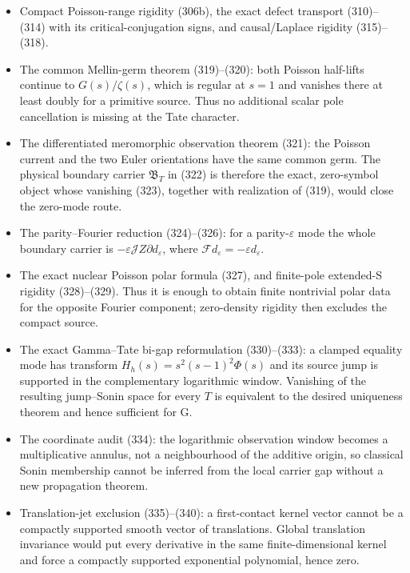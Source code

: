 \documentclass[11pt]{article}
\begin{document}
\begin{itemize}
\item Compact Poisson-range rigidity (306b), the exact defect transport
      (310)--(314) with its critical-conjugation signs, and causal/Laplace
      rigidity (315)--(318).
\item The common Mellin-germ theorem (319)--(320): both Poisson half-lifts
      continue to $G(s)/\zeta(s)$, which is regular at $s=1$ and vanishes
      there at least doubly for a primitive source.  Thus no additional
      scalar pole cancellation is missing at the Tate character.
\item The differentiated meromorphic observation theorem (321): the
      Poisson current and the two Euler orientations have the same common
      germ.  The physical boundary carrier $\mathfrak B_T$ in (322) is
      therefore the exact, zero-symbol object whose vanishing (323), together
      with realization of (319), would close the zero-mode route.
\item The parity--Fourier reduction (324)--(326): for a parity-$\varepsilon$
      mode the whole boundary carrier is
      $-\varepsilon\mathscr JZ\partial d_\varepsilon$, where
      $\mathcal Fd_\varepsilon=-\varepsilon d_\varepsilon$.
\item The exact nuclear Poisson polar formula (327), and finite-pole
      extended-S rigidity (328)--(329).  Thus it is enough to obtain finite
      nontrivial polar data for the opposite Fourier component; zero-density
      rigidity then excludes the compact source.
\item The exact Gamma--Tate bi-gap reformulation (330)--(333): a clamped
      equality mode has transform
      $H_h(s)=s^2(s-1)^2\Phi(s)$ and its source jump is supported in the
      complementary logarithmic window.  Vanishing of the resulting
      jump--Sonin space for every $T$ is equivalent to the desired uniqueness
      theorem and hence sufficient for G.
\item The coordinate audit (334): the logarithmic observation window becomes
      a multiplicative annulus, not a neighbourhood of the additive origin,
      so classical Sonin membership cannot be inferred from the local carrier
      gap without a new propagation theorem.
\item Translation-jet exclusion (335)--(340): a first-contact kernel vector
      cannot be a compactly supported smooth vector of translations.  Global
      translation invariance would put every derivative in the same
      finite-dimensional kernel and force a compactly supported exponential
      polynomial, hence zero.

\end{itemize}
\end{document}
